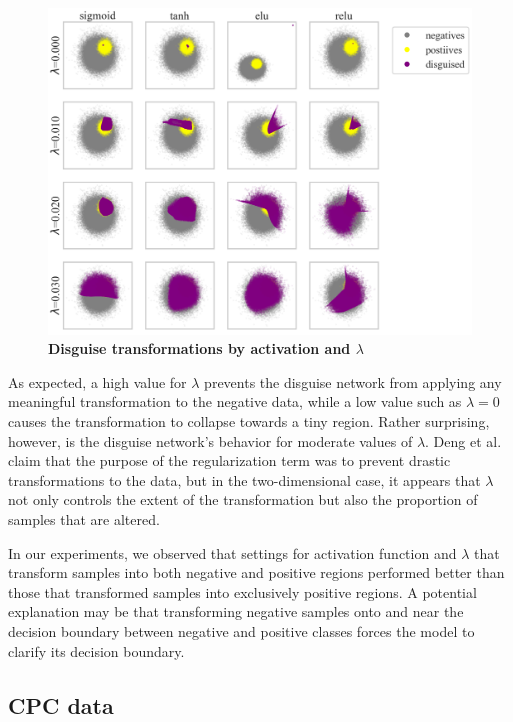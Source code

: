 \documentclass{proc}
\begin{document}
\begin{figure}[h!]
	\begin{center}
		\includegraphics*[scale=0.55]{../figures/disguise-plots.png}
		\caption{\textbf{Disguise transformations by activation and $\lambda$}}
		\label{fig:disguise-plots}
	\end{center}
\end{figure}

As expected, a high value for $\lambda$ prevents the disguise network from applying any meaningful transformation to the negative data, while a low value such as $\lambda = 0$ causes the transformation to collapse towards a tiny region. Rather surprising, however, is the disguise network's behavior for moderate values of $\lambda$. Deng et al. claim that the purpose of the regularization term was to prevent drastic transformations to the data, but in the two-dimensional case, it appears that $\lambda$ not only controls the extent of the transformation but also the proportion of samples that are altered.

In our experiments, we observed that settings for activation function and $\lambda$ that transform samples into both negative and positive regions performed better than those that transformed samples into exclusively positive regions. A potential explanation may be that transforming negative samples onto and near the decision boundary between negative and positive classes forces the model to clarify its decision boundary.

\subsection{CPC data}
\end{document}

